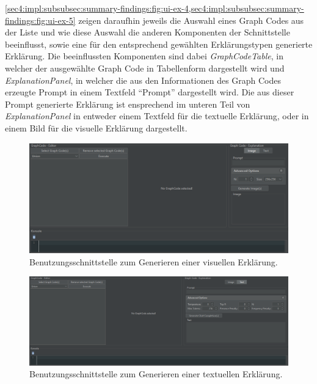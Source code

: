 \cref{sec4:impl:subsubsec:summary-findings:fig:ui-ex-4,sec4:impl:subsubsec:summary-findings:fig:ui-ex-5} zeigen daraufhin jeweils die Auswahl eines Graph Codes aus der Liste und wie diese Auswahl die anderen Komponenten der Schnittstelle beeinflusst, sowie eine für den entsprechend gewählten Erklärungstypen generierte Erklärung.
Die beeinflussten Komponenten sind dabei \textit{GraphCodeTable}, in welcher der ausgewählte Graph Code in Tabellenform dargestellt wird und \textit{ExplanationPanel}, in welcher die aus den Informationen des Graph Codes erzeugte Prompt in einem Textfeld \enquote{Prompt} dargestellt wird.
Die aus dieser Prompt generierte Erklärung ist ensprechend im unteren Teil von \textit{ExplanationPanel} in entweder einem Textfeld für die textuelle Erklärung, oder in einem Bild für die visuelle Erklärung dargestellt.


\begin{landscape}
  \begin{figure}
    \includegraphics[width=\textwidth]{chapter/chapter_4/ui-ex-1}
    \caption{Benutzungsschnittstelle zum Generieren einer visuellen Erklärung.}
    \label{sec4:impl:subsubsec:summary-findings:fig:ui-ex-1}
  \end{figure}
\end{landscape}

\begin{landscape}
  \begin{figure}
    \includegraphics[width=\textwidth]{chapter/chapter_4/ui-ex-2}
    \caption{Benutzungsschnittstelle zum Generieren einer textuellen Erklärung.}
    \label{sec4:impl:subsubsec:summary-findings:fig:ui-ex-2}
  \end{figure}
\end{landscape}

